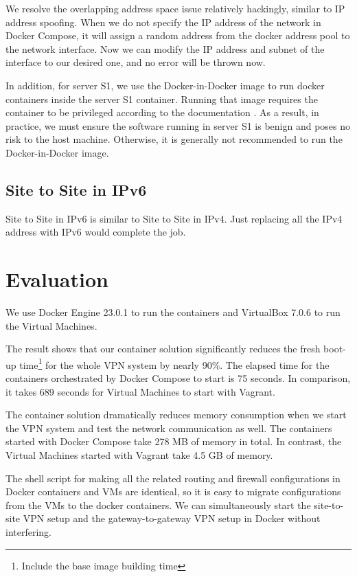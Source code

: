 \documentclass[article]{aaltoseries}
\begin{document}
We resolve the overlapping address space issue relatively hackingly, similar to IP address spoofing. When we do not specify the IP address of the network in Docker Compose, it will assign a random address from the docker address pool to the network interface. Now we can modify the IP address and subnet of the interface to our desired one, and no error will be thrown now.

In addition, for server S1, we use the Docker-in-Docker image to run docker containers inside the server S1 container. Running that image requires the container to be privileged according to the documentation \cite{docker}. As a result, in practice, we must ensure the software running in server S1 is benign and poses no risk to the host machine. Otherwise, it is generally not recommended to run the Docker-in-Docker image.

\subsection{Site to Site in IPv6}

Site to Site in IPv6 is similar to Site to Site in IPv4. Just replacing all the IPv4 address with IPv6 would complete the job.


\section{Evaluation}

We use Docker Engine 23.0.1 to run the containers and VirtualBox 7.0.6 to run the Virtual Machines.

The result shows that our container solution significantly reduces the fresh boot-up time\footnote{Include the base image building time} for the whole VPN system by nearly 90\%. The elapsed time for the containers orchestrated by Docker Compose to start is 75 seconds. In comparison, it takes 689 seconds for Virtual Machines to start with Vagrant.

The container solution dramatically reduces memory consumption when we start the VPN system and test the network communication as well. The containers started with Docker Compose take 278 MB of memory in total. In contrast, the Virtual Machines started with Vagrant take 4.5 GB of memory.

The shell script for making all the related routing and firewall configurations in Docker containers and VMs are identical, so it is easy to migrate configurations from the VMs to the docker containers. We can simultaneously start the site-to-site VPN setup and the gateway-to-gateway VPN setup in Docker without interfering.
\end{document}
